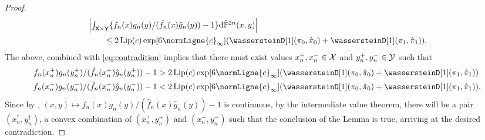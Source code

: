 \documentclass[11pt,a4paper]{article}
\begin{document}
\begin{proof}
\begin{align}
  &\abs{\textstyle{ \int_{\msx \times \msy} \{f_n(x) g_n(y) / (\hat{f}_n(x) \hat{g}_n(y)) - 1\}\rmd \hat{\Pbb}^{2n}(x,y) }}\\
  & \qquad \leq 2 \Lip(c) \exp[6 \normLigne{c}_\infty] (\wassersteinD[1](\pi_0, \hat{\pi}_0) + \wassersteinD[1](\pi_1, \hat{\pi}_1) ).
\end{align}
The above, combined with \eqref{eq:contradition} implies that  there must exist values $x_n^+, x_n^- \in \mathcal{X}$ and $y_n^+, y_n^-\in \mathcal{Y}$ such that 
\begin{align}
    f_n(x_n^+) g_n(y_n^+) / (\hat{f}_n(x_n^+) \hat{g}_n(y_n^+)) - 1 &>  2 \Lip(c) \exp[6 \normLigne{c}_\infty] (\wassersteinD[1](\pi_0, \hat{\pi}_0) + \wassersteinD[1](\pi_1, \hat{\pi}_1) )\\
    f_n(x_n^-) g_n(y_n^-) / (\hat{f}_n(x_n^-) \hat{g}_n(y_n^-)) - 1 &<  2 \Lip(c) \exp[6 \normLigne{c}_\infty] (\wassersteinD[1](\pi_0, \hat{\pi}_0) + \wassersteinD[1](\pi_1, \hat{\pi}_1) ).
\end{align}
Since by , $(x,y)\mapsto f_n(x) g_n(y) / (\hat{f}_n(x) \hat{g}_n(y)) - 1$ is continuous, by the intermediate value theorem, there will be a pair $(x_n^\dagger, y_n^\dagger)$, a convex combination of $(x_n^+, y_n^+)$ and $(x_n^-, y_n^-)$ such that the conclusion of the Lemma is true, arriving at the desired contradiction.
\end{proof}

\end{document}
